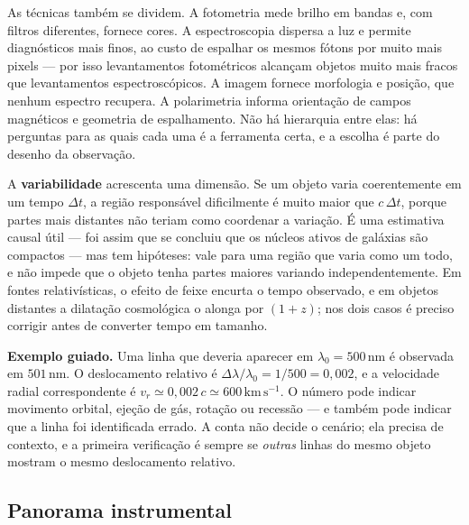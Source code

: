 \documentclass[11pt,a4paper]{article}
\begin{document}
As técnicas também se dividem. A fotometria mede brilho em bandas e, com filtros diferentes, fornece cores. A
espectroscopia dispersa a luz e permite diagnósticos mais finos, ao custo de espalhar os mesmos fótons por muito
mais pixels --- por isso levantamentos fotométricos alcançam objetos muito mais fracos que levantamentos
espectroscópicos. A imagem fornece morfologia e posição, que nenhum espectro recupera. A polarimetria informa
orientação de campos magnéticos e geometria de espalhamento. Não há hierarquia entre elas: há perguntas para as
quais cada uma é a ferramenta certa, e a escolha é parte do desenho da observação.

A \textbf{variabilidade} acrescenta uma dimensão. Se um objeto varia coerentemente em um tempo $\Delta t$, a
região responsável dificilmente é muito maior que $c\,\Delta t$, porque partes mais distantes não teriam como
coordenar a variação. É uma estimativa causal útil --- foi assim que se concluiu que os núcleos ativos de
galáxias são compactos --- mas tem hipóteses: vale para uma região que varia como um todo, e não impede que o
objeto tenha partes maiores variando independentemente. Em fontes relativísticas, o efeito de feixe encurta o
tempo observado, e em objetos distantes a dilatação cosmológica o alonga por $(1+z)$; nos dois casos é preciso
corrigir antes de converter tempo em tamanho.

\textbf{Exemplo guiado.} Uma linha que deveria aparecer em $\lambda_0=500\,\mathrm{nm}$ é observada em
$501\,\mathrm{nm}$. O deslocamento relativo é $\Delta\lambda/\lambda_0=1/500=0{,}002$, e a velocidade radial
correspondente é $v_r\simeq0{,}002\,c\simeq600\,\mathrm{km\,s^{-1}}$. O número pode indicar movimento orbital,
ejeção de gás, rotação ou recessão --- e também pode indicar que a linha foi identificada errado. A conta não
decide o cenário; ela precisa de contexto, e a primeira verificação é sempre se \emph{outras} linhas do mesmo
objeto mostram o mesmo deslocamento relativo.

\subsection*{Panorama instrumental}
\end{document}
